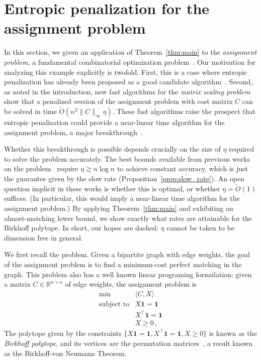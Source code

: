 \documentclass[final,12pt]{colt2018}
\newcommand{\RR}{\mathbb{R}}
\newcommand{\1}{\mathds{1}}
\newcommand{\bone}{\mathbf{1}}
\begin{document}
\section{Entropic penalization for the assignment problem}\label{sec:assignment}
In this section, we given an application of Theorem~\ref{thm:main} to the \emph{assignment problem}, a fundamental combinatorial optimization problem~\citep{Sch03}.
Our motivation for analyzing this example explicitly is twofold.
First, this is a case where entropic penalization has already been proposed as a good candidate algorithm~\citep{KosYui94,ShaGauGri11}.
Second, as noted in the introduction, new fast algorithms for the \emph{matrix scaling problem}~\citep{CohMadTsi17,AllLiOli17} show that a penalized version of the assignment problem with cost matrix $C$ can be solved in time $\tilde O(n^2 \|C\|_\infty \eta)$.
These fast algorithms raise the prospect that entropic penalization could provide a near-linear time algorithm for the assignment problem, a major breakthrough~\citep[see, e.g.,][]{Mad13}.

Whether this breakthrough is possible depends crucially on the size of $\eta$ required to solve the problem accurately.
The best bounds available from previous works on the problem~\citep{KosYui94,ShaGauGri11} require $\eta \gtrsim n \log n$ to achieve constant accuracy, which is just the guarantee given by the slow rate (Proposition~\ref{prop:slow_rate}).
An open question implicit in these works is whether this is optimal, or whether $\eta = \tilde O(1)$ suffices.
(In particular, this would imply a near-linear time algorithm for the assignment problem.)
By applying Theorem~\ref{thm:main} and exhibiting an almost-matching lower bound, we show exactly what rates are attainable for the Birkhoff polytope.
In short, our hopes are dashed: $\eta$ cannot be taken to be dimension free in general.

We first recall the problem.
Given a bipartite graph with edge weights, the goal of the assignment problem is to find a minimum-cost perfect matching in the graph.
This problem also has a well known linear programing formulation: given a matrix $C \in \RR^{n \times n}$ of edge weights, the assignment problem is
\begin{equation}\label{eq:assignment}
\begin{array}{rl}
\min & \langle C, X \rangle  \\
\text{subject to}& X \bone = \bone \\
& X^\top \bone = \bone \\
& X  \geq 0\,,
\end{array}
\end{equation}
The polytope given by the constraints $\{X \bone = \bone, X^\top \bone = \bone, X \geq 0\}$ is known as the \emph{Birkhoff polytope}, and its vertices are the permutation matrices~\citep{Bru06}, a result known as the Birkhoff-von Neumann Theorem.
\end{document}
